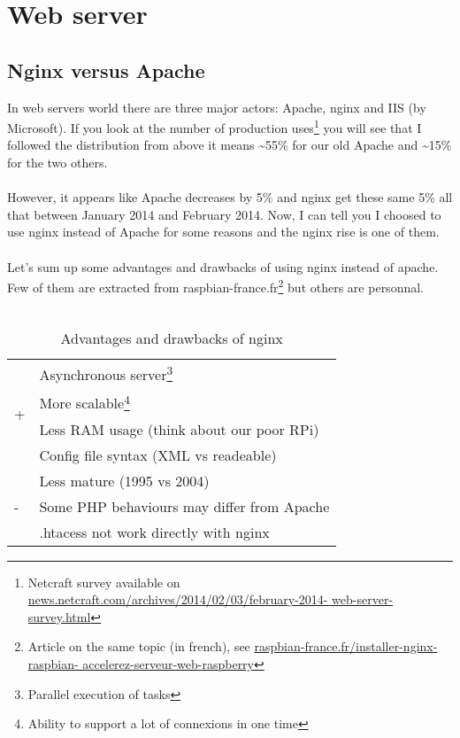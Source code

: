 \chapter{Web server}
\section{Nginx versus Apache}
In web servers world there are three major actors: Apache, nginx and 
IIS (by Microsoft). If you look at the number of production uses\footnote{Netcraft 
survey available on \href{http://news.netcraft.com/archives/2014/02/03/february-
2014-web-server-survey.html}{news.netcraft.com/archives/2014/02/03/february-2014-
web-server-survey.html}} you will see that I followed the distribution from above 
it means \textasciitilde{}55\% for our old Apache and \textasciitilde{}15\% for 
the two others.
\\\\
However, it appears like Apache decreases by 5\% and nginx get these same 5\% all 
that between January 2014 and February 2014. Now, I can tell you I choosed to use 
nginx instead of Apache for some reasons and the nginx rise is one of them.
\\\\
Let's sum up some advantages and drawbacks of using nginx instead of apache. Few 
of them are extracted from raspbian-france.fr\footnote{Article on the same topic 
(in french), see \href{http://raspbian-france.fr/installer-nginx-raspbian-
accelerez-serveur-web-raspberry}{raspbian-france.fr/installer-nginx-raspbian-
accelerez-serveur-web-raspberry}} but others are personnal. 
\\\\
\begin{table}
\label{table:AvantagesNginx}
\centering
	\begin{tabular}{C{1cm}|p{9cm}}
		& Asynchronous server\footnote{Parallel execution of tasks}\\
		& More scalable\footnote{Ability to support a lot of connexions in one time}\\
		& Less RAM usage (think about our poor RPi)\\
		& Config file syntax (XML vs readeable)\\
		\hline
		& Less mature (1995 vs 2004)\\ 
		& Some PHP behaviours may differ from Apache\\
		& .htacess not work directly with nginx\\
	\end{tabular}
	\caption{Advantages and drawbacks of nginx}
\end{table}
\newpage
